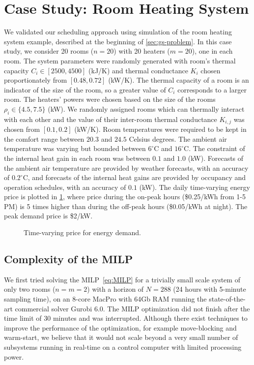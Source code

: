 \section{Case Study: Room Heating System}
\label{sec:simulation}

We validated our scheduling approach using simulation of the room heating system example, described at the beginning of \cref{sec:gs-problem}.
In this case study, we consider 20 rooms ($n=20$) with 20 heaters ($m=20$), one in each room.
The system parameters were randomly generated with room's thermal capacity $C_i \in [2500, 4500]$ (kJ/K) and thermal conductance $K_i$ chosen proportionately from $[0.48,0.72]$ (kW/K).
The thermal capacity of a room is an indicator of the size of the room, so a greater value of $C_{i}$ corresponds to a larger room.
The heaters' powers were chosen based on the size of the rooms $\rho_i \in \{4.5, 7.5\}$ (kW).
We randomly assigned rooms which can thermally interact with each other and the value of their inter-room thermal conductance $K_{i,j}$ was chosen from $[0.1,0.2]$ (kW/K). %
Room temperatures were required to be kept in the comfort range between $20.3$ and $24.5$ Celsius degrees.
The ambient air temperature was varying but bounded between $6^{\circ}\mathrm{C}$ and $16^{\circ}\mathrm{C}$. 
The constraint of the internal heat gain in each room was between $0.1$ and $1.0$ (kW).
Forecasts of the ambient air temperature are provided by weather forecasts, with an accuracy of $0.2^{\circ}\mathrm{C}$, and forecasts of the internal heat gains are provided by occupancy and operation schedules, with an accuracy of $0.1$ (kW).
The daily time-varying energy price is plotted in \cref{fig:simulation:price}, where %
 price during the on-peak hours (\$0.25/kWh from 1-5 PM) is 5 times higher than during the off-peak hours (\$0.05/kWh at night).
The peak demand price is \$2/kW.

\begin{figure}[tb]
  \centering
  
  \caption{Time-varying price for energy demand.}
  \label{fig:simulation:price}
\end{figure}


\subsection{Complexity of the MILP} %
\label{sec:simulation:milp}

We first tried solving the MILP~\eqref{eq:MILP} for a trivially small scale system of only two rooms ($n=m=2$) with a horizon of $N=288$ (24 hours with 5-minute sampling time), on an 8-core MacPro with 64Gb RAM running the state-of-the-art commercial solver Gurobi 6.0.
The MILP optimization did not finish after the time limit of 30 minutes and was interrupted.
Although there exist techniques to improve the performance of the optimization, for example move-blocking and warm-start, we believe that it would not scale beyond a very small number of subsystems running in real-time on a control computer with limited processing power.

